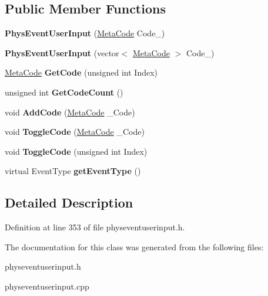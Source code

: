 \subsection*{Public Member Functions}
\begin{DoxyCompactItemize}
\item 
\hypertarget{classPhysEventUserInput_a218bec21fe49efcba82f3480e2386968}{
{\bfseries PhysEventUserInput} (\hyperlink{classMetaCode}{MetaCode} Code\_\-)}
\label{dc/d0e/classPhysEventUserInput_a218bec21fe49efcba82f3480e2386968}

\item 
\hypertarget{classPhysEventUserInput_ab9451ee5b385a3c575922ec7cfa07747}{
{\bfseries PhysEventUserInput} (vector$<$ \hyperlink{classMetaCode}{MetaCode} $>$ Code\_\-)}
\label{dc/d0e/classPhysEventUserInput_ab9451ee5b385a3c575922ec7cfa07747}

\item 
\hypertarget{classPhysEventUserInput_a590b347fcd5db7a48fc460b1ed538e4f}{
\hyperlink{classMetaCode}{MetaCode} {\bfseries GetCode} (unsigned int Index)}
\label{dc/d0e/classPhysEventUserInput_a590b347fcd5db7a48fc460b1ed538e4f}

\item 
\hypertarget{classPhysEventUserInput_a8232572283b9dc85c96a2b28479123a8}{
unsigned int {\bfseries GetCodeCount} ()}
\label{dc/d0e/classPhysEventUserInput_a8232572283b9dc85c96a2b28479123a8}

\item 
\hypertarget{classPhysEventUserInput_a2b30cdf2aedb70940b85bb9e4665230f}{
void {\bfseries AddCode} (\hyperlink{classMetaCode}{MetaCode} \_\-Code)}
\label{dc/d0e/classPhysEventUserInput_a2b30cdf2aedb70940b85bb9e4665230f}

\item 
\hypertarget{classPhysEventUserInput_a4d95c43110ac7023c5da208c14db565f}{
void {\bfseries ToggleCode} (\hyperlink{classMetaCode}{MetaCode} \_\-Code)}
\label{dc/d0e/classPhysEventUserInput_a4d95c43110ac7023c5da208c14db565f}

\item 
\hypertarget{classPhysEventUserInput_a1bf30bbab980fd0beee52509bdb4a2ad}{
void {\bfseries ToggleCode} (unsigned int Index)}
\label{dc/d0e/classPhysEventUserInput_a1bf30bbab980fd0beee52509bdb4a2ad}

\item 
\hypertarget{classPhysEventUserInput_a7adabb15e8012a86c9da1910033eea4b}{
virtual EventType {\bfseries getEventType} ()}
\label{dc/d0e/classPhysEventUserInput_a7adabb15e8012a86c9da1910033eea4b}

\end{DoxyCompactItemize}


\subsection{Detailed Description}


Definition at line 353 of file physeventuserinput.h.

The documentation for this class was generated from the following files:\begin{DoxyCompactItemize}
\item 
physeventuserinput.h\item 
physeventuserinput.cpp\end{DoxyCompactItemize}
